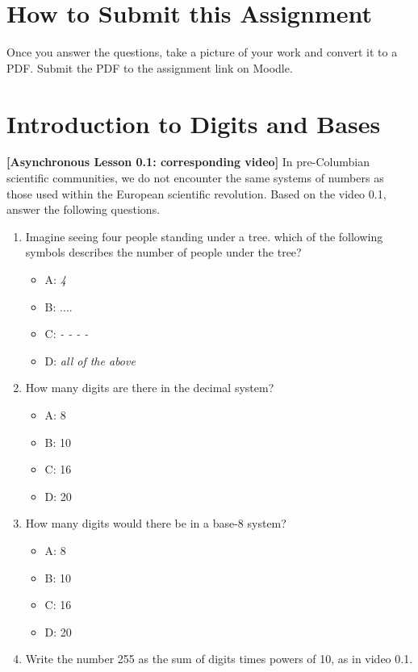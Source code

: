 \documentclass[10pt]{article}
\begin{document}
\maketitle

\section{How to Submit this Assignment}

Once you answer the questions, take a picture of your work and convert it to a PDF.  Submit the PDF to the assignment link on Moodle.

\section{Introduction to Digits and Bases}

\textbf{[Asynchronous Lesson 0.1: corresponding video]} In pre-Columbian scientific communities, we do not encounter the same systems of numbers as those used within the European scientific revolution.  Based on the video 0.1, answer the following questions.

\begin{enumerate}
\item Imagine seeing four people standing under a tree.  which of the following symbols describes the number of people under the tree?
\begin{itemize}
\item A: \textit{4}
\item B: $....$
\item C: \textit{- - - -}
\item D: \textit{all of the above}
\end{itemize}
\item How many digits are there in the decimal system?
\begin{itemize}
\item A: 8
\item B: 10
\item C: 16
\item D: 20
\end{itemize}
\item How many digits would there be in a base-8 system?
\begin{itemize}
\item A: 8
\item B: 10
\item C: 16
\item D: 20
\end{itemize}
\item Write the number 255 as the sum of digits times powers of 10, as in video 0.1. \\ \vspace{2cm}
\end{enumerate}
\end{document}
